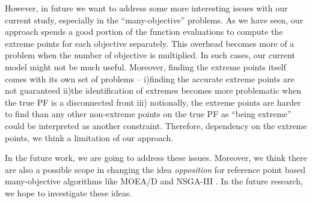 \documentclass[journal]{IEEEtran}
\begin{document}
However, in future we want to address some more interesting issues with our current study, especially in the ``many-objective'' problems. As we have seen, our approach spends a good portion of the function evaluations to compute the extreme points for each objective separately. This overhead becomes more of a problem when the number of objective is multiplied. In such cases, our current model might not be much useful. Moreover, finding the extreme points itself comes with its own set of problems -- i)finding the accurate extreme points are not guaranteed ii)the identification of extremes becomes more problematic when the true PF is a disconnected front iii) notionally, the extreme points are harder to find than any other non-extreme points on the true PF as ``being extreme'' could be interpreted as another constraint. Therefore, dependency on the extreme points, we think a limitation of our approach.

In the future work, we are going to address these issues. Moreover, we think there are also a possible scope in changing the idea \textit{opposition} for reference point based many-objective algorithms like MOEA/D and NSGA-III \cite{nsga3-main-p1}\cite{nsga3-main-p2}. In the future research, we hope to investigate these ideas. \vfill \eject 
\end{document}
